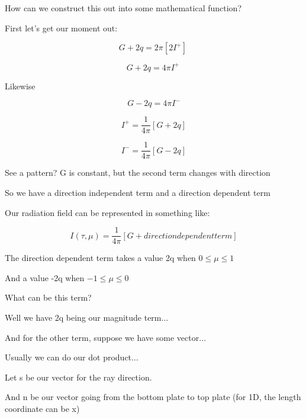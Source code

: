\documentclass[12pt]{article}
\renewcommand{\_}{\kern-1.5pt\textunderscore\kern-1.5pt}
\begin{document}
\begin{itemize}
How can we construct this out into some mathematical function?\par

First let’s get our moment out:\par

 \[ G+2q=2 \pi  \left[ 2I^{+} \right] ~ \] \par

 \[ G+2q=4 \pi I^{+}~ \] \par

Likewise\par

 \[ G-2q=4 \pi I^{-} \] \par

 \[ I^{+}=\frac{1}{4 \pi } \left[ G+2q \right]  \] \par

 \[ I^{-}=\frac{1}{4 \pi } \left[ G-2q \right]  \] \par

See a pattern? G is constant, but the second term changes with direction\par

So we have a direction independent term and a direction dependent term\par

Our radiation field can be represented in something like:\par

 \[ I \left(  \tau, \mu  \right) =\frac{1}{4 \pi } \left[ G+direction dependent term \right]  \] \par

The direction dependent term takes a value 2q when  \( 0 \leq  \mu  \leq 1 \) \par

And a value -2q when  \( -1 \leq  \mu  \leq 0 \) \par

What can be this term?\par

Well we have 2q being our magnitude term$ \ldots $ \par

And for the other term, suppose we have some vector$ \ldots $ \par

Usually we can do our dot product$ \ldots $ \par

Let s be our vector for the ray direction.\par

And n be our vector going from the bottom plate to top plate (for 1D, the length coordinate can be x)\par


\end{itemize}
\end{document}
